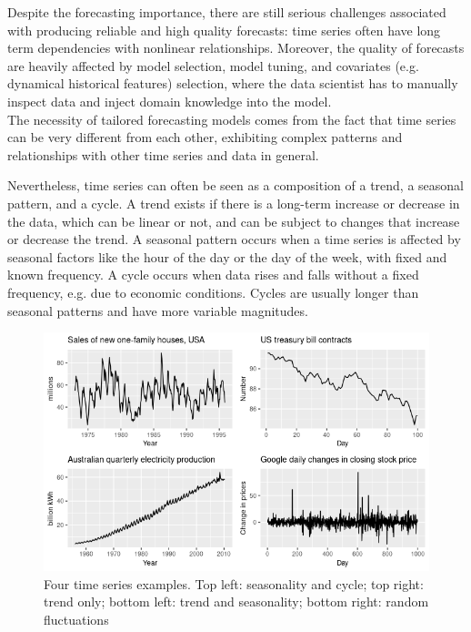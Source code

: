 \documentclass[a4paper]{article} %
\begin{document}
	Despite the forecasting importance, there are still serious challenges associated with producing reliable and high quality forecasts: time series often have long term dependencies with nonlinear relationships.  Moreover, the quality of forecasts are heavily affected by model selection, model tuning, and covariates (e.g. dynamical historical features) selection, where the data scientist has to manually inspect data and inject domain knowledge into the model.\\
	The necessity of tailored forecasting models comes from the fact that time series can be very different from each other, exhibiting complex patterns and relationships with other time series and data in general. 
	
	Nevertheless, time series can often be seen as a composition of a trend, a seasonal pattern, and a cycle.
	A trend exists if there is a long-term increase or decrease in the data, which can be linear or not, and can be subject to changes that increase or decrease the trend.
	A seasonal pattern occurs when a time series is affected by seasonal factors like the hour of the day or the day of the week, with fixed and known frequency.
	A cycle occurs when data rises and falls without a fixed frequency, e.g. due to economic conditions.  Cycles are usually longer than seasonal patterns and have more variable magnitudes.
	
	\begin{figure}[H]
	\includegraphics[width=\linewidth]{img/sota_ts_components.png}
	\caption{Four time series examples. Top left: seasonality and cycle; top right: trend only; bottom left: trend and seasonality; bottom right: random fluctuations}
	\end{figure}
	
\end{document}
